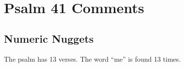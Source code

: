 \section{Psalm 41 Comments}

\subsection{Numeric Nuggets}
The psalm has 13 verses. The word ``me'' is found 13 times.
